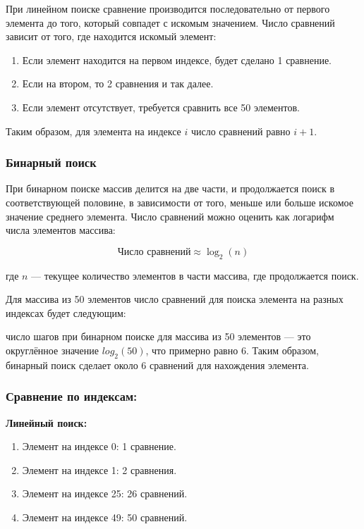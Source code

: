 \hspace{1.25cm}
При линейном поиске сравнение производится последовательно от первого элемента до того, который совпадет с искомым значением. Число сравнений зависит от того, где находится искомый элемент:

\begin{enumerate}
    \item Если элемент находится на первом индексе, будет сделано 1 сравнение.
    \item Если на втором, то 2 сравнения и так далее.
    \item Если элемент отсутствует, требуется сравнить все 50 элементов.
\end{enumerate}

Таким образом, для элемента на индексе \(i\) число сравнений равно \(i + 1\).

\subsubsection*{Бинарный поиск}

\hspace{1.25cm}
При бинарном поиске массив делится на две части, и продолжается поиск в соответствующей половине, в зависимости от того, меньше или больше искомое значение среднего элемента. Число сравнений можно оценить как логарифм числа элементов массива:

\begin{equation}
\text{Число сравнений} \approx \log_2(n)
\end{equation}

где \(n\) — текущее количество элементов в части массива, где продолжается поиск.

Для массива из 50 элементов число сравнений для поиска элемента на разных индексах будет следующим:

число шагов при бинарном поиске для массива из 50 элементов — это округлённое значение $log_2(50)$, что примерно равно 6. Таким образом, бинарный поиск сделает около 6 сравнений для нахождения элемента.

\subsubsection*{Сравнение по индексам:}

\textbf{Линейный поиск:}
\begin{enumerate}
    \item Элемент на индексе 0: 1 сравнение.
    \item Элемент на индексе 1: 2 сравнения.
    \item Элемент на индексе 25: 26 сравнений.
    \item Элемент на индексе 49: 50 сравнений.
\end{enumerate}

